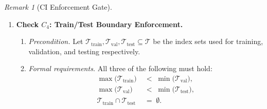 \documentclass[12pt,openany]{book}
\numberwithin{equation}{chapter}
\theoremstyle{plain}
\theoremstyle{definition}
\theoremstyle{remark}
\newtheorem{remark}[theorem]{Remark}
\numberwithin{equation}{chapter}
\theoremstyle{plain}
\begin{document}
\begin{remark}[CI Enforcement Gate]
\begin{enumerate}
\begin{enumerate}
  \end{enumerate}

  \item \textbf{Check $C_{4}$: Train/Test Boundary
        Enforcement.}
  \label{ci:boundary}

  \begin{enumerate}

    \item \emph{Precondition.}
          Let $\mathcal{T}_{\mathrm{train}},
          \mathcal{T}_{\mathrm{val}},
          \mathcal{T}_{\mathrm{test}} \subseteq \mathcal{T}$
          be the index sets used for training, validation,
          and testing respectively.

    \item \emph{Formal requirements.}
          All three of the following must hold:
          \begin{align}
            \max\!\bigl(\mathcal{T}_{\mathrm{train}}\bigr)
            &\;<\;
            \min\!\bigl(\mathcal{T}_{\mathrm{val}}\bigr),
            \label{eq:ci-boundary-1} \\[4pt]
            \max\!\bigl(\mathcal{T}_{\mathrm{val}}\bigr)
            &\;<\;
            \min\!\bigl(\mathcal{T}_{\mathrm{test}}\bigr),
            \label{eq:ci-boundary-2} \\[4pt]
            \mathcal{T}_{\mathrm{train}}
            \cap \mathcal{T}_{\mathrm{test}}
            &\;=\; \emptyset.
            \label{eq:ci-boundary-3}
          \end{align}


\end{enumerate}
\end{enumerate}
\end{remark}
\end{document}
